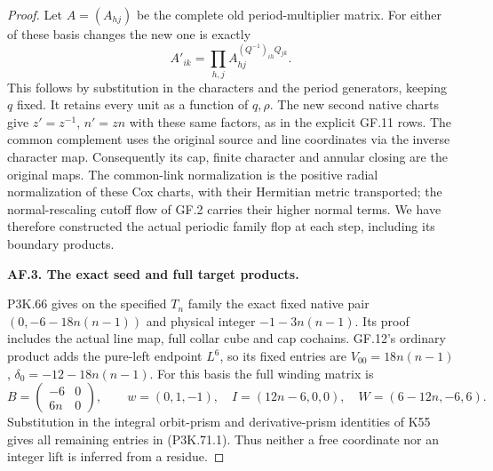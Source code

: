 \begin{proof}
Let \(A=(A_{hj})\) be the complete old period-multiplier matrix.
For either of these basis changes the new one is exactly
\[
 A'_{ik}=\prod_{h,j}A_{hj}^{(Q^{-1})_{ih}Q_{jk}}.
                                                            \tag{P3K.71.7}
\]
This follows by substitution in the characters and the period
generators, keeping \(q\) fixed. It retains every unit as a
function of \(q,\rho\). The new second native charts give
\(z'=z^{-1}\), \(n'=zn\) with these same factors, as in the
explicit GF.11 rows. The common complement uses the original
source and line coordinates via the inverse character map.
Consequently its cap, finite character and annular closing
are the original maps. The common-link normalization is the
positive radial normalization of these Cox charts, with their
Hermitian metric transported; the normal-rescaling cutoff
flow of GF.2 carries their higher normal terms. We have
therefore constructed the actual periodic family flop at
each step, including its boundary products.

\par\medskip\noindent\textbf{AF.3. The exact seed and full target products.}\par\nopagebreak[4]

P3K.66 gives on the specified \(T_n\) family the exact fixed
native pair \((0,-6-18n(n-1))\) and physical integer
\(-1-3n(n-1)\). Its proof includes the actual line map,
full collar cube and cap cochains. GF.12's ordinary product
adds the pure-left endpoint \(L^6\), so its fixed entries
are \(V_{00}=18n(n-1)\), \(\delta_0=-12-18n(n-1)\).
For this basis the full winding matrix is
\[
 B=\begin{pmatrix}-6&0\\6n&0\end{pmatrix},\qquad
 w=(0,1,-1),\quad
 I=(12n-6,0,0),\quad W=(6-12n,-6,6).
\]
Substitution in the integral orbit-prism and derivative-prism
identities of K55 gives all remaining entries in (P3K.71.1).
Thus neither a free coordinate nor an integer lift is inferred
from a residue.


\end{proof}
